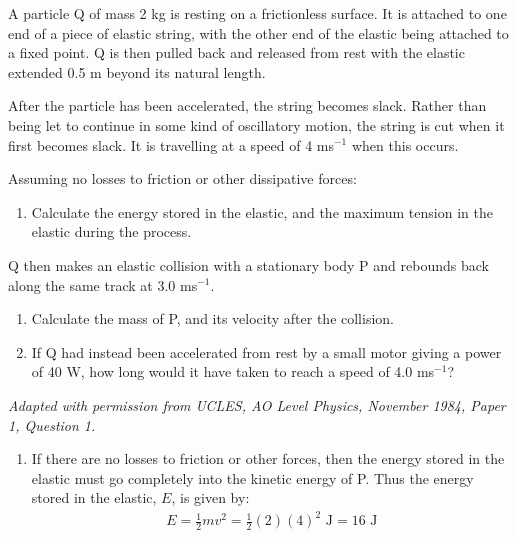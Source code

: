 
\begin{problem}[AO1984PIQ1a]
{A particle Q of mass 2 kg is resting on a frictionless surface. It is attached to one end of a piece of elastic string, with the other end of the elastic being attached to a fixed point. Q is then pulled back and released from rest with the elastic extended 0.5 m beyond its natural length. 

After the particle has been accelerated, the string becomes slack. Rather than being let to continue in some kind of oscillatory motion, the string is cut when it first becomes slack. It is travelling at a speed of 4 ms$^{-1}$ when this occurs.

Assuming no losses to friction or other dissipative forces:
\begin{enumerate}
	\item Calculate the energy stored in the elastic, and the maximum tension in the elastic during the process.
\end{enumerate}
Q then makes an elastic collision with a stationary body P and rebounds back along the same track at 3.0 ms$^{-1}$. 
\begin{enumerate}[resume]
	\item Calculate the mass of P, and its velocity after the collision.
	\item If Q had instead been accelerated from rest by a small motor giving a power of 40 W, how long would it have taken to reach a speed of 4.0 ms$^{-1}$?
\end{enumerate}
\vspace{-0.4cm}
}
{\textit{Adapted with permission from UCLES, AO Level Physics, November 1984, Paper 1, Question 1.}}
{\begin{enumerate}
	\item If there are no losses to friction or other forces, then the energy stored in the elastic must go completely into the kinetic energy of P. Thus the energy stored in the elastic, $E$, is given by:
\begin{align*} E = \frac{1}{2}mv^{2} = \frac{1}{2}(2)(4)^{2} \textrm{ J} = 16 \textrm{ J} \end{align*}


\end{enumerate}}
\end{problem}
